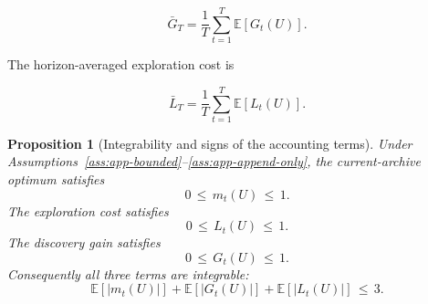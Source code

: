\documentclass{article} %
\newtheorem{proposition}[theorem]{Proposition}
\begin{document}
\begin{equation}
\label{eq:app-barg}
\bar G_T
=
\frac{1}{T}\sum_{t=1}^{T}\mathbb{E}[G_t(U)].
\end{equation}

The horizon-averaged exploration cost is

\begin{equation}
\label{eq:app-barl}
\bar L_T
=
\frac{1}{T}\sum_{t=1}^{T}\mathbb{E}[L_t(U)].
\end{equation}

\begin{proposition}[Integrability and signs of the accounting terms]
\label{prop:1}
Under Assumptions~\ref{ass:app-bounded}--\ref{ass:app-append-only}, the current-archive optimum satisfies
\begin{equation}
\label{eq:app-prop-m-bound}
0 \,\le\, m_t(U) \,\le\, 1.
\end{equation}
The exploration cost satisfies
\begin{equation}
\label{eq:app-prop-l-bound}
0 \,\le\, L_t(U) \,\le\, 1.
\end{equation}
The discovery gain satisfies
\begin{equation}
\label{eq:app-prop-g-bound}
0 \,\le\, G_t(U) \,\le\, 1.
\end{equation}
Consequently all three terms are integrable:
\begin{equation}
\label{eq:app-prop-integrable}
\mathbb{E}[|m_t(U)|]+\mathbb{E}[|G_t(U)|]+\mathbb{E}[|L_t(U)|] \,\le\, 3.
\end{equation}
\end{proposition}
\end{document}
